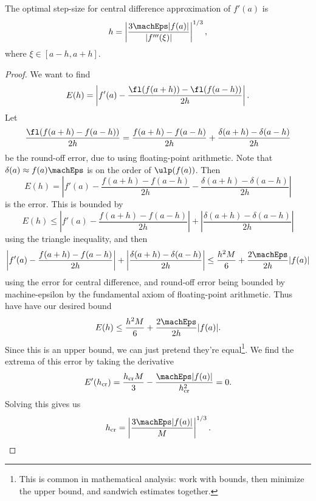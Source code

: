 \begin{thm}
  The optimal step-size for central difference approximation of $f'(a)$ is
  \begin{equation}
    h = \left|\frac{3\machEps |f(a)|}{|f'''(\xi)|}\right|^{1/3},
  \end{equation}
  where $\xi\in[a-h,a+h]$.
\end{thm}
\begin{proof}
  We want to find
  \begin{equation}
    E(h) = \left|f'(a) - \frac{\fl(f(a+h))-\fl(f(a-h))}{2h}\right|.
  \end{equation}
  Let
  \begin{equation}
    \frac{\fl(f(a+h) - f(a-h))}{2h} = \frac{f(a+h)-f(a-h)}{2h} + \frac{\delta(a+h)-\delta(a-h)}{2h}
  \end{equation}
  be the round-off error, due to using floating-point arithmetic. Note
  that $\delta(a)\approx f(a)\machEps$ is on the order of $\ulp(f(a))$.
  Then
  \begin{equation}
     E(h) = \left|f'(a) - \frac{f(a+h)-f(a-h)}{2h} - \frac{\delta(a+h)-\delta(a-h)}{2h}\right|
  \end{equation}
  is the error. This is bounded by
  \begin{equation}
     E(h) \leq\left|f'(a) - \frac{f(a+h)-f(a-h)}{2h}\right|+ \left|\frac{\delta(a+h)-\delta(a-h)}{2h}\right|
  \end{equation}
  using the triangle inequality, and then
  \begin{equation}
    \left|f'(a) - \frac{f(a+h)-f(a-h)}{2h}\right|+ \left|\frac{\delta(a+h)-\delta(a-h)}{2h}\right|
    \leq\frac{h^{2}M}{6} + \frac{2\machEps}{2h}|f(a)|
  \end{equation}
  using the error for central difference, and round-off error being
  bounded by machine-epsilon by the fundamental axiom of floating-point arithmetic.
  Thus have have our desired bound
  \begin{equation}\label{eq:quadrature:derivatives:error-bound}
    E(h) \leq\frac{h^{2}M}{6} + \frac{2\machEps}{2h}|f(a)|.
  \end{equation}
  Since this is an upper bound, we can just pretend they're
  equal\footnote{This is common in mathematical analysis: work with
  bounds, then minimize the upper bound, and sandwich estimates together.}.
  We find the extrema of this error by taking the derivative
  \begin{equation}
    E'(h_{\text{cr}})=\frac{h_{\text{cr}}M}{3}-\frac{\machEps |f(a)|}{h_{\text{cr}}^{2}}=0.
  \end{equation}
  Solving this gives us
  \begin{equation*}
    h_{\text{cr}} = \left|\frac{3\machEps |f(a)|}{M}\right|^{1/3}.\qedhere
  \end{equation*}
\end{proof}

